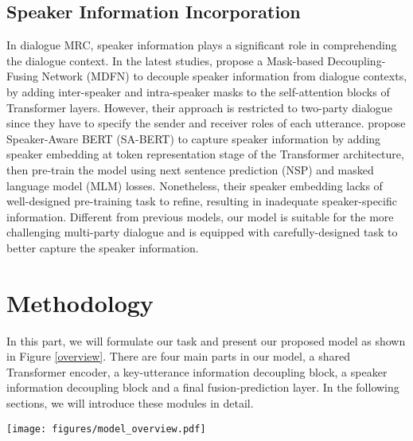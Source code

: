 \documentclass[11pt]{article}
\begin{document}
	\subsection{Speaker Information Incorporation}
	In dialogue MRC, speaker information plays a significant role in comprehending the dialogue context. In the latest studies, \citet{liu2021filling} propose a Mask-based Decoupling-Fusing Network (MDFN) to decouple speaker information from dialogue contexts, by adding inter-speaker and intra-speaker masks to the self-attention blocks of Transformer layers. However, their approach is restricted to two-party dialogue since they have to specify the sender and receiver roles of each utterance. \citet{gu2020speaker} propose Speaker-Aware BERT (SA-BERT) to capture speaker information by adding speaker embedding at token representation stage of the Transformer architecture, then pre-train the model using next sentence prediction (NSP) and masked language model (MLM) losses. Nonetheless, their speaker embedding lacks of well-designed pre-training task to refine, resulting in inadequate speaker-specific information. Different from previous models, our model is suitable for the more challenging multi-party dialogue and is equipped with carefully-designed task to better capture the speaker information.
	
	\section{Methodology}
	In this part, we will formulate our task and present our proposed model as shown in Figure \ref{overview}. There are four main parts in our model, a shared Transformer encoder, a key-utterance information decoupling block, a speaker information decoupling block and a final fusion-prediction layer. In the following sections, we will introduce these modules in detail.
	
	\begin{figure*}[htbp]
		\texttt{[image: figures/model\_overview.pdf]}
		\centering
		\caption{The overview of our model, which contains a shared Transformer encoder, a key-utterance information decoupling block, a speaker information decoupling block and a fusion-prediction layer. In speaker information decoupling block, the bi-directional arrow means that the information flows from and to both sides, the unidirectional arrow means that the information only flows from start nodes to end nodes.} 
		\label{overview}
	\end{figure*}
	
\end{document}
